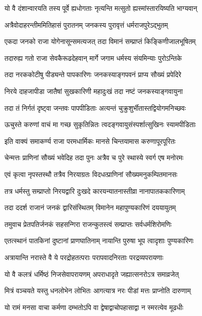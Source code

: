 \twolineshloka
{यो वै दंशान्वारयति तस्य पूर्वे ह्यधोगताः}
{नृत्यन्ति मत्सुतो ह्यस्मांस्तारयिष्यति भाग्यवान्}%

\twolineshloka
{अत्रैवोदाहरन्तीममितिहासं पुरातनम्}
{जनकस्य पुरावृत्तं धर्मराजपुरेऽद्भुतम्}%

\twolineshloka
{एकदा जनको राजा योगेनासून्समत्यजत्}
{तदा विमानं सम्प्राप्तं किङ्किणीजालभूषितम्}%

\twolineshloka
{तदारुह्य गतो राजा सेवकैरूढदेहवान्}
{मार्गे जगाम धर्मस्य संयमिन्याः पुरोऽन्तिके}%

\twolineshloka
{तदा नरककोटीषु पीड्यन्ते पापकारिणः}
{जनकस्याङ्गपवनं प्राप्य सौख्यं प्रपेदिरे}%

\twolineshloka
{निरये दाहजापीडा जातैषां सुखकारिणी}
{महादुःखं तदा नष्टं जनकस्याङ्गवायुना}%

\twolineshloka
{तदा तं निर्गतं दृष्ट्वा जन्तवः पापपीडिताः}
{अत्यन्तं चुक्रुशुर्भीतास्तद्वियोगमनिच्छवः}%

\twolineshloka
{ऊचुस्ते करुणां वाचं मा गच्छ सुकृतिन्नितः}
{त्वदङ्गवायुसंस्पर्शात्सुखिनः स्यामपीडिताः}%

\twolineshloka
{इति वाक्यं समाकर्ण्य राजा परमधार्मिकः}
{मानसे चिन्तयामास करुणापूरपूरितः}%

\twolineshloka
{चेन्मत्तः प्राणिनां सौख्यं भवेदिह तदा पुनः}
{अत्रैव च पुरे स्थास्ये स्वर्ग एष मनोरमः}%

\twolineshloka
{एवं कृत्वा नृपस्तस्थौ तत्रैव निरयाग्रतः}
{विदधत्प्राणिनां सौख्यमनुकम्पितमानसः}%

\twolineshloka
{तत्र धर्मस्तु सम्प्राप्तो निरयद्वारि दुःखदे}
{कारयन्यातनास्तीव्रा नानापातककारिणाम्}%

\twolineshloka
{तदा ददर्श राजानं जनकं द्वारिसंस्थितम्}
{विमानेन महापुण्यकारिणं दययायुतम्}%

\twolineshloka
{तमुवाच प्रेतपतिर्जनकं सहसन्गिरा}
{राजन्कुतस्त्वं सम्प्राप्तः सर्वधर्मशिरोमणिः}%

\twolineshloka
{एतत्स्थानं पातकिनां दुष्टानां प्राणघातिनाम्}
{नायान्ति पुरुषा भूप त्वादृशाः पुण्यकारिणः}%

\twolineshloka
{अत्रायान्ति नरास्ते वै ये परद्रोहतत्पराः}
{परापवादनिरताः परद्रव्यपरायणाः}%

\twolineshloka
{यो वै कलत्रं धर्मिष्ठं निजसेवापरायणम्}
{अपराधादृते जह्यात्सनरोऽत्र समाव्रजेत्}%

\twolineshloka
{मित्रं वञ्चयते यस्तु धनलोभेन लोभितः}
{आगत्यात्र नरः पीडां मत्तः प्राप्नोति दारुणाम्}%

\twolineshloka
{यो रामं मनसा वाचा कर्मणा दम्भतोऽपि वा}
{द्वेषाद्वाचोपहासाद्वा न स्मरत्येव मूढधीः}%

